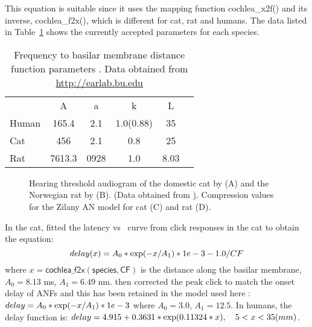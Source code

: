 
This equation is suitable since it uses the mapping function \mbox{\textsf{cochlea\_x2f()}} and its inverse, \mbox{\textsf{cochlea\_f2x()}}, which is different for cat, rat and humans.
The data listed in Table~\ref{tab:f2x} shows the currently accepted parameters for each species.


\begin{table}[ht]
  \centering
  \begin{tabular}{lccccc}
  \hline
      &   A  &  a   &     k     & L \\
Human & 165.4 & 2.1  & 1.0(0.88) & 35\\
 Cat  &  456  & 2.1  &    0.8    & 25 \\
 Rat  & 7613.3& 0928 &    1.0    & 8.03 \\
  \hline
  \end{tabular}
  \caption[Basilar membrane frequency-distance function parameters]{Frequency to basilar membrane distance function parameters \citep{FitzGeraldBurkittEtAl:2001}. Data obtained from \url{http://earlab.bu.edu} \label{tab:f2x}}
\end{table}

\begin{figure}[htb]
  \begin{center}
    \caption[Audiogram and compression in rats and cats]%
{Hearing threshold audiogram of the domestic cat by \citet{HeffnerHeffner:1985} (A) and the Norwegian rat by \citet{HeffnerHeffner:1985} (B).
(Data obtained from \href{earlab.bu.edu}).
Compression values for the Zilany AN model for cat (C) and rat (D).
\label{fig:AudThresholdCatRat}}
  \end{center}
\end{figure}


In the cat, \citet{CarneyYin:1988} fitted the latency vs \CF~curve from click responses in the cat to obtain the equation:
\begin{equation}
  \label{eq:delay}
   delay (x) = A_0 * {\rm exp}(-x / A_1 ) * 1e-3 - 1.0/CF
\end{equation}
\noindent where $x = \mathsf{cochlea\_f2x(species, CF)}$ is the distance along the basilar membrane, $A_0 = 8.13$ ms, $A_1 = 6.49$ nm.
\citet{HeinzZhangEtAl:2001} then corrected the peak click to match the onset delay of ANFs and this has been retained in the model used here \citep{ZilanyBruceEtAl:2009}: \(delay = A_0 * {\rm exp}(-x / A_1) * 1e-3 \) where $A_0 = 3.0$, $A_1 = 12.5$. In humans, the delay function is: \( delay = 4.915 + 0.3631 * {\rm exp}(0.11324*x),\quad  5<x<35 (mm) \).

